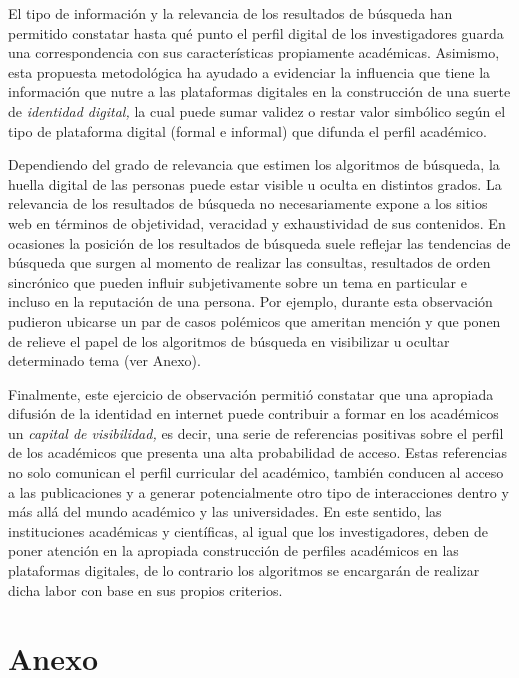 \documentclass[
  spanish,
  11pt,
  a4paper,
]{scrbook}
\begin{document}

El tipo de información y la relevancia de los resultados de búsqueda han
permitido constatar hasta qué punto el perfil digital de los
investigadores guarda una correspondencia con sus características
propiamente académicas. Asimismo, esta propuesta metodológica ha ayudado
a evidenciar la influencia que tiene la información que nutre a las
plataformas digitales en la construcción de una suerte de
\emph{identidad digital,} la cual puede sumar validez o restar valor
simbólico según el tipo de plataforma digital (formal e informal) que
difunda el perfil académico.

Dependiendo del grado de relevancia que estimen los algoritmos de
búsqueda, la huella digital de las personas puede estar visible u oculta
en distintos grados. La relevancia de los resultados de búsqueda no
necesariamente expone a los sitios web en términos de objetividad,
veracidad y exhaustividad de sus contenidos. En ocasiones la posición de
los resultados de búsqueda suele reflejar las tendencias de búsqueda que
surgen al momento de realizar las consultas, resultados de orden
sincrónico que pueden influir subjetivamente sobre un tema en particular
e incluso en la reputación de una persona. Por ejemplo, durante esta
observación pudieron ubicarse un par de casos polémicos que ameritan
mención y que ponen de relieve el papel de los algoritmos de búsqueda en
visibilizar u ocultar determinado tema (ver Anexo).

Finalmente, este ejercicio de observación permitió constatar que una
apropiada difusión de la identidad en internet puede contribuir a formar
en los académicos un \emph{capital de visibilidad,} es decir, una serie
de referencias positivas sobre el perfil de los académicos que presenta
una alta probabilidad de acceso. Estas referencias no solo comunican el
perfil curricular del académico, también conducen al acceso a las
publicaciones y a generar potencialmente otro tipo de interacciones
dentro y más allá del mundo académico y las universidades. En este
sentido, las instituciones académicas y científicas, al igual que los
investigadores, deben de poner atención en la apropiada construcción de
perfiles académicos en las plataformas digitales, de lo contrario los
algoritmos se encargarán de realizar dicha labor con base en sus propios
criterios.

\section*{Anexo}\label{anexo}
\end{document}
